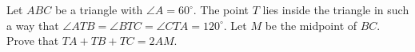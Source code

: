 Let $ABC$ be a triangle with $\angle A = 60^\circ$.  The point $T$ lies inside the triangle in such a way that $\angle ATB = \angle BTC = \angle CTA = 120^\circ$.  Let $M$ be the midpoint of $BC$.  Prove that $TA + TB + TC = 2AM$.